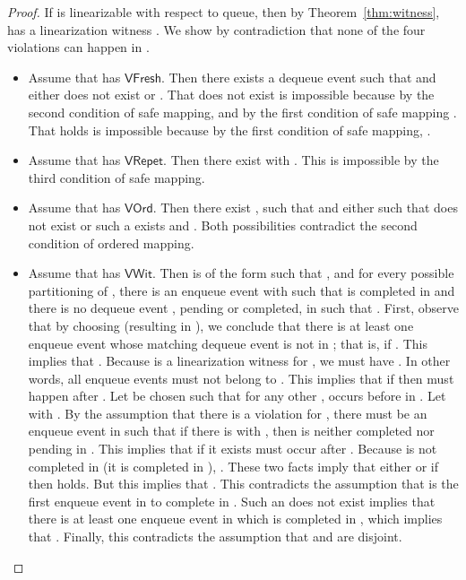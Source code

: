 \documentclass{LMCS}
\newcommand{\VFresh}{\ensuremath{\mathsf{VFresh}}}
\newcommand{\VRepet}{\ensuremath{\mathsf{VRepet}}}
\newcommand{\VOrd}{\ensuremath{\mathsf{VOrd}}}
\newcommand{\VWit}{\ensuremath{\mathsf{VWit}}}
\begin{document}
\begin{proof}\hfill

\noindent{\bf()} If  is linearizable with respect to queue, then by Theorem~\ref{thm:witness},  has a linearization witness .
We show by contradiction that none of the four violations can happen in .

\begin{itemize}
\item Assume that  has \VFresh.
Then there exists a dequeue event  such that  and either  does not exist or .
That  does not exist is impossible because by the second condition of safe mapping,  and by the first condition of safe mapping .
That  holds is impossible because by the first condition of safe mapping, .

\item Assume that  has \VRepet.
Then there exist  with .
This is impossible by the third condition of safe mapping.

\item Assume that  has \VOrd.
Then there exist ,  such that  and either  such that  does not exist or such a  exists and .
Both possibilities contradict the second condition of ordered mapping.

\item Assume that  has \VWit.
Then  is of the form  such that , and for every possible partitioning of , there is an enqueue event  with  such that  is completed in  and there is no dequeue event , pending or completed, in  such that .
First, observe that by choosing  (resulting in ), we conclude that there is at least one enqueue event  whose matching dequeue event  is not in ; that is,  if .
This implies that .
Because  is a linearization witness for , we must have .
In other words, all enqueue events  must not belong to .
This implies that if  then  must happen after .
Let  be chosen such that for any other ,  occurs before  in .
Let  with . 
By the assumption that there is a  violation for , there must be an enqueue event  in  such that if there is  with , then  is neither completed nor pending in .
This implies that  if it exists must occur after .
Because  is not completed in  (it is completed in ), .
These two facts imply that either  or if  then  holds.
But this implies that .
This contradicts the assumption that  is the first enqueue event in  to complete in .
Such an  does not exist implies that there is at least one enqueue event  in  which is completed in , which implies that . 
Finally, this contradicts the assumption that  and  are disjoint.
\end{itemize}





\end{proof}
\end{document}
